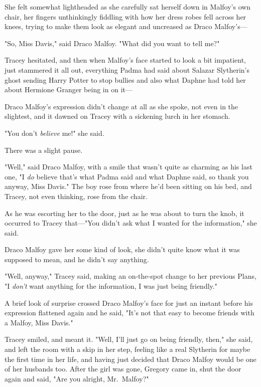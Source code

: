 She felt somewhat lightheaded as she carefully sat herself down in Malfoy's own 
chair, her fingers unthinkingly fiddling with how her dress robes fell across 
her knees, trying to make them look as elegant and uncreased as Draco 
Malfoy's---

"So, Miss Davis," said Draco Malfoy. "What did you want to tell me?"

Tracey hesitated, and then when Malfoy's face started to look a bit impatient, 
just stammered it all out, everything Padma had said about Salazar Slytherin's 
ghost sending Harry Potter to stop bullies and also what Daphne had told her 
about Hermione Granger being in on it---

Draco Malfoy's expression didn't change at all as she spoke, not even in the 
slightest, and it dawned on Tracey with a sickening lurch in her stomach.

"You don't \emph{believe} me!" she said.

There was a slight pause.

"Well," said Draco Malfoy, with a smile that wasn't quite as charming as his 
last one, "I \emph{do} believe that's what Padma said and what Daphne said, so 
thank you anyway, Miss Davis." The boy rose from where he'd been sitting on his 
bed, and Tracey, not even thinking, rose from the chair.

As he was escorting her to the door, just as he was about to turn the knob, it 
occurred to Tracey that---"You didn't ask what I wanted for the information," 
she said.

Draco Malfoy gave her some kind of look, she didn't quite know what it was 
supposed to mean, and he didn't say anything.

"Well, anyway," Tracey said, making an on-the-spot change to her previous 
Plans, "I \emph{don't} want anything for the information, I was just being 
friendly."

A brief look of surprise crossed Draco Malfoy's face for just an instant before 
his expression flattened again and he said, "It's not that easy to become 
friends with a Malfoy, Miss Davis."

Tracey smiled, and meant it. "Well, I'll just go on being friendly, then," she 
said, and left the room with a skip in her step, feeling like a real Slytherin 
for maybe the first time in her life, and having just decided that Draco Malfoy 
would be one of her husbands too.
\sbreak
After the girl was gone, Gregory came in, shut the door again and said, "Are 
you alright, Mr.~Malfoy?"

